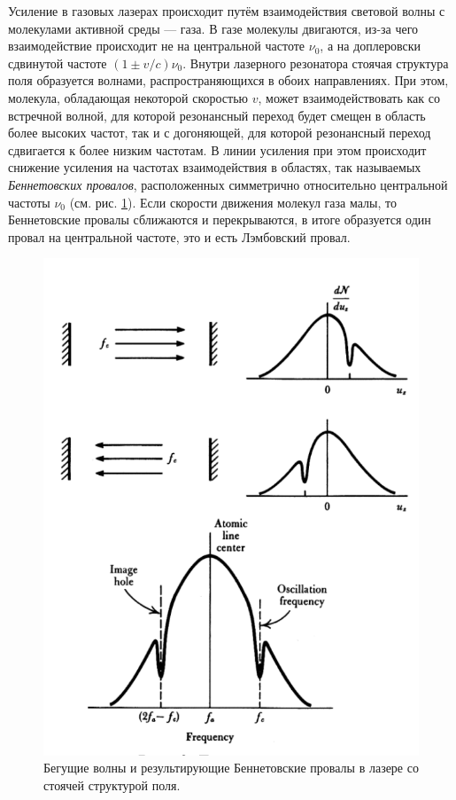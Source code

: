 \documentclass[12pt, russian, a4paper]{article}
\begin{document}
	Усиление в газовых лазерах происходит путём взаимодействия световой волны с молекулами активной среды --- газа. В газе молекулы двигаются, из-за чего взаимодействие происходит не на центральной частоте $\nu_0$, а на доплеровски сдвинутой частоте $(1\pm v/c)\nu_0$. Внутри лазерного резонатора стоячая структура поля образуется волнами, распространяющихся в обоих направлениях. При этом, молекула, обладающая некоторой скоростью $v$, может взаимодействовать как со встречной волной, для которой резонансный переход будет смещен в область более высоких частот, так и с догоняющей, для которой резонансный переход сдвигается к более низким частотам. В линии усиления при этом происходит снижение усиления на частотах взаимодействия в областях, так называемых \emph{Беннетовских провалов}, расположенных симметрично относительно центральной частоты $\nu_0$ (см. рис. \ref{fig:bennet-failure}). Если скорости движения молекул газа малы, то Беннетовские провалы сближаются и перекрываются, в итоге образуется один провал на центральной частоте, это и есть Лэмбовский провал.

	\begin{figure}[htbp]
		\centering
		\includegraphics[scale=0.5]{../images/bennet-failure.png}
		\caption{Бегущие волны и результирующие Беннетовские провалы в лазере со стоячей структурой поля.}
		\label{fig:bennet-failure}
	\end{figure}
\end{document}
